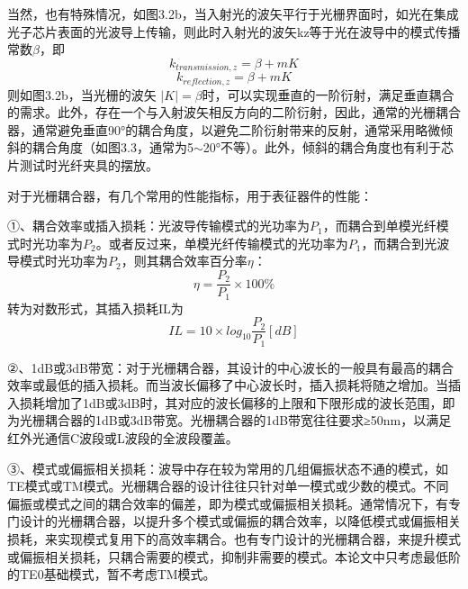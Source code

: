 当然，也有特殊情况，如图3.2b，当入射光的波矢平行于光栅界面时，如光在集成光子芯片表面的光波导上传输，则此时入射光的波矢kz等于光在波导中的模式传播常数$\beta$，即
\begin{equation}
k_{transmission,z}= \beta + mK
\end{equation}
\begin{equation}
k_{reflection,z}= \beta + mK
\end{equation}
则如图3.2b，当光栅的波矢 $|K| =\beta$时，可以实现垂直的一阶衍射，满足垂直耦合的需求。此外，存在一个与入射波矢相反方向的二阶衍射，因此，通常的光栅耦合器，通常避免垂直90°的耦合角度，以避免二阶衍射带来的反射，通常采用略微倾斜的耦合角度（如图3.3，通常为5$\sim$20°不等）。此外，倾斜的耦合角度也有利于芯片测试时光纤夹具的摆放。

对于光栅耦合器，有几个常用的性能指标，用于表征器件的性能：\cite{Dirkgrating,Kevingrating}

①、耦合效率或插入损耗：光波导传输模式的光功率为$P_1$，而耦合到单模光纤模式时光功率为$P_2$。或者反过来，单模光纤传输模式的光功率为$P_1$，而耦合到光波导模式时光功率为$P_2$，则其耦合效率百分率$\eta$：
\begin{equation}
\eta = \frac{P_2}{P_1} \times 100\% 
\end{equation}
转为对数形式，其插入损耗IL为
\begin{equation}
IL = 10\times log_{10}{\frac{P_2}{P_1}}  [dB]
\end{equation}

②、1dB或3dB带宽：对于光栅耦合器，其设计的中心波长的一般具有最高的耦合效率或最低的插入损耗。而当波长偏移了中心波长时，插入损耗将随之增加。当插入损耗增加了1dB或3dB时，其对应的波长偏移的上限和下限形成的波长范围，即为光栅耦合器的1dB或3dB带宽。光栅耦合器的1dB带宽往往要求≥50nm，以满足红外光通信C波段或L波段的全波段覆盖。

③、模式或偏振相关损耗：波导中存在较为常用的几组偏振状态不通的模式，如TE模式或TM模式。光栅耦合器的设计往往只针对单一模式或少数的模式。不同偏振或模式之间的耦合效率的偏差，即为模式或偏振相关损耗。通常情况下，有专门设计的光栅耦合器，以提升多个模式或偏振的耦合效率，以降低模式或偏振相关损耗，来实现模式复用下的高效率耦合。也有专门设计的光栅耦合器，来提升模式或偏振相关损耗，只耦合需要的模式，抑制非需要的模式。本论文中只考虑最低阶的TE0基础模式，暂不考虑TM模式。


